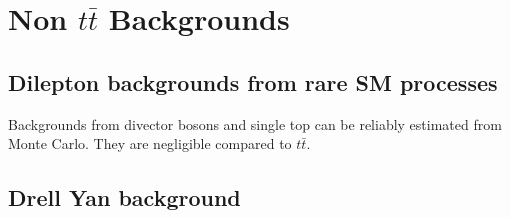 \section{Non $t\bar{t}$ Backgrounds}
\label{sec:othBG}

\subsection{Dilepton backgrounds from rare SM processes}
\label{sec:bgrare}
Backgrounds from divector bosons and single top
can be reliably estimated from Monte Carlo.
They are negligible compared to $t\bar{t}$. 


\subsection{Drell Yan background}
\label{sec:dybg}
 





